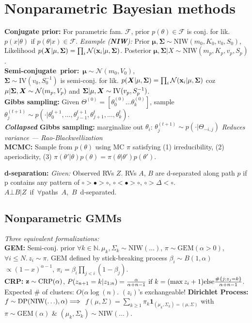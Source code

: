 \section*{Nonparametric Bayesian methods}
\textbf{Conjugate prior:} For parametric fam. $\mathcal{F}$, prior $p(\theta)\in\mathcal{F}$ is conj. for lik. $p(x|\theta)$ if $p(\theta|x)\in\mathcal{F}$.
\emph{Example (\textbf{NIW}):} Prior $\mathbf{\mu},\mathbf{\Sigma}\sim\mathrm{NIW}(m_0,K_0,v_0,S_0)$, Likelihood
$p({\bm{X}}|\mathbf{\mu},\mathbf{\Sigma}) = \prod_i \mathcal{N}({\mathbf{x}}_i|\mathbf{\mu},\mathbf{\Sigma})$.
Posterior $\mathbf{\mu},\mathbf{\Sigma}|X\sim\mathrm{NIW}(m_p,K_p,v_p,S_p)$.\\
\mbox{\textbf{Semi-conjugate prior:} $\mathbf{\mu}\sim\mathcal{N}(m_0,V_0)$,}\\$\mathbf{\Sigma}\sim\mathrm{IV}(v_0,S_0^{-1})$ is semi-conj. for lik. $p({\bm{X}}|\mathbf{\mu},\mathbf{\Sigma}) = \prod_i \mathcal{N}({\mathbf{x}}_i|\mathbf{\mu},\mathbf{\Sigma})$ coz $\mathbf{\mu}|\mathbf{\Sigma},{\bm{X}}\sim\mathcal{N}(m_p,V_p)$ and $\mathbf{\Sigma}|\mathbf{\mu},{\bm{X}}\sim\mathrm{IV}(v_p,S_p^{-1})$.\\
\textbf{Gibbs sampling:} Given $\Theta^{(0)} = [\theta^{(0)}_0\ldots\theta^{(0)}_k]$, sample $\theta_j^{(t+1)}\sim p(\cdot|\theta_0^{t+1},\ldots,\theta_{j-1}^{t+1},\theta_{j+1}^t,\ldots,\theta_k^t)$.\\
\textbf{\emph{Collapsed} Gibbs sampling:} marginalize out $\theta_i$: $\theta_j^{(t+1)}\sim p(\cdot|\Theta_{-i,j})$ \emph{Reduces variance --- Rao-Blackwellization}\\
\textbf{MCMC:} Sample from $p(\theta)$ using MC $\pi$ satisfying
(1) irreducibility, (2) aperiodicity, (3) $\pi(\theta'|\theta)p(\theta) = \pi(\theta|\theta')p(\theta')$.

\textbf{d-separation:} \emph{Given:} Observed RVs $Z$.
RVs $A$, $B$ are d-separated along path $p$ if p contains
any pattern of $\circ>\bullet>\circ$, $\circ<\bullet>\circ$, $\circ>\Delta<\circ$.\\
\mbox{$A \bot B | Z$ if $\forall$paths $A$, $B$ d-separated.}

\subsection*{Nonparametric GMMs}
\emph{Three equivalent formalizations:}\\
\textbf{GEM:} Semi-conj. prior $\forall k\in\mathbb{N}.\,\mu_k,\Sigma_k\sim\mathrm{NIW}(\ldots)$, $\pi\sim\mathrm{GEM}(\alpha > 0)$, $\forall i\leq N.\,z_i\sim\pi$.
GEM defined by stick-breaking process $\beta_i\sim B(1,\alpha)$\\$\propto(1-x)^{\alpha-1}$, $\pi_i=\beta_i\prod_{j<i}(1-\beta_j)$.\\
\textbf{CRP:} ${\mathbf{z}}\sim\mathrm{CRP}(\alpha)$, $P(z_{n+1}=k|z_{1:n})= \frac{\alpha}{\alpha+n-1} {\color{black}\textrm{ if }} k=(\max z_i+1) {\color{black}\mathrm{ else }} \frac{\#\{j:z_j=k\}}{\alpha+n-1}$. Expected \# of clusters: $O(\alpha\log(n)$. $(z_i)$'s exchangeable! 
\textbf{Dirichlet Process:} $f\sim\mathrm{DP}(\mathrm{NIW}(\ldots),\alpha) {\color{black}\implies} $
$f(\mu,\Sigma)=\sum_{k\geq1}\pi_k\mathbf{1}_{(\mu_k,\Sigma_k)=(\mu,\Sigma)}$ with $\pi\sim\mathrm{GEM}(\alpha)$ \& $(\mu_k,\Sigma_k)\sim\mathrm{NIW}(\ldots)$.
